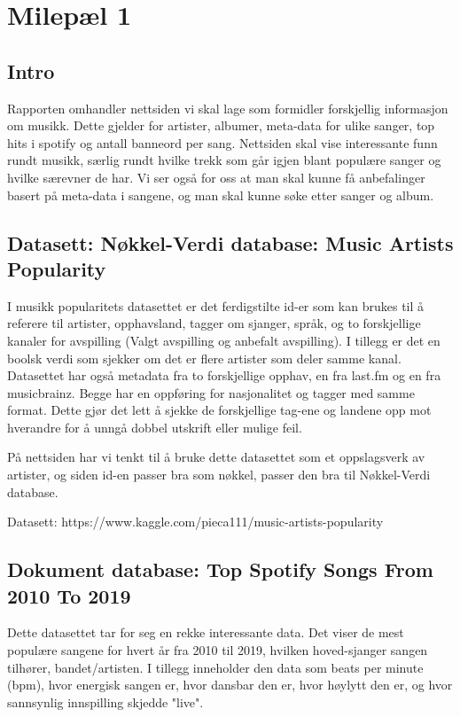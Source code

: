 
\section{Milepæl 1}

\subsection{Intro}
Rapporten omhandler nettsiden vi skal lage som formidler forskjellig informasjon om musikk. Dette gjelder for artister, albumer, meta-data for ulike sanger, top hits i spotify og antall banneord per sang. Nettsiden skal vise interessante funn rundt musikk, særlig rundt hvilke trekk som går igjen blant populære sanger og hvilke særevner de har. Vi ser også for oss at man skal kunne få anbefalinger basert på meta-data i sangene, og man skal kunne søke etter sanger og album.

\subsection{Datasett: Nøkkel-Verdi database: Music Artists Popularity}
I musikk popularitets datasettet er det ferdigstilte id-er som kan brukes til å referere til artister, opphavsland, tagger om sjanger, språk, og to forskjellige kanaler for avspilling (Valgt avspilling og anbefalt avspilling). I tillegg er det en boolsk verdi som sjekker om det er flere artister som deler samme kanal. Datasettet har også metadata fra to forskjellige opphav, en fra last.fm og en fra musicbrainz. Begge har en oppføring for nasjonalitet og tagger med samme format. Dette gjør det lett å sjekke de forskjellige tag-ene og landene opp mot hverandre for å unngå dobbel utskrift eller mulige feil.

På nettsiden har vi tenkt til å bruke dette datasettet som et oppslagsverk av artister, og siden id-en passer bra som nøkkel, passer den bra til Nøkkel-Verdi database.

Datasett: https://www.kaggle.com/pieca111/music-artists-popularity

\subsection{Dokument database: Top Spotify Songs From 2010 To 2019}
Dette datasettet tar for seg en rekke interessante data. Det viser de mest populære sangene for hvert år fra 2010 til 2019, hvilken hoved-sjanger sangen tilhører, bandet/artisten. I tillegg inneholder den data som beats per minute (bpm), hvor energisk sangen er, hvor dansbar den er, hvor høylytt den er, og hvor sannsynlig innspilling skjedde "live".

